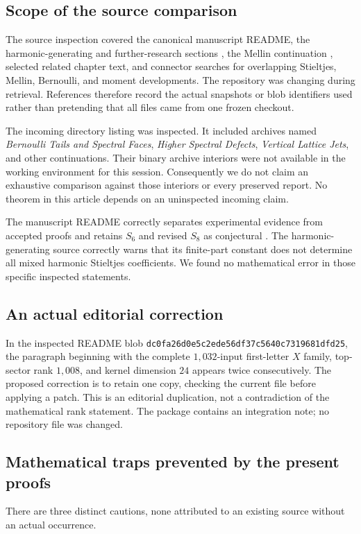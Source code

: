 \documentclass[11pt,letterpaper]{article}
\numberwithin{equation}{section}
\theoremstyle{definition}\newtheorem{definition}[theorem]{Definition}
\theoremstyle{remark}\newtheorem{remark}[theorem]{Remark}
\begin{document}
\subsection{Scope of the source comparison}
The source inspection covered the canonical manuscript README,
the harmonic-generating and further-research sections
\cite{RepoHarmonic,RepoQuestions}, the Mellin continuation
\cite{RepoMellin}, selected related chapter text, and connector searches
for overlapping Stieltjes, Mellin, Bernoulli, and moment developments.
The repository was changing during retrieval. References therefore
record the actual snapshots or blob identifiers used rather than
pretending that all files came from one frozen checkout.

The incoming directory listing was inspected. It included archives
named \emph{Bernoulli Tails and Spectral Faces}, \emph{Higher Spectral
Defects}, \emph{Vertical Lattice Jets}, and other continuations. Their
binary archive interiors were not available in the working environment
for this session. Consequently we do not claim an exhaustive comparison
against those interiors or every preserved report. No theorem in this
article depends on an uninspected incoming claim.

The manuscript README correctly separates experimental evidence from
accepted proofs and retains $S_6$ and revised $S_8$ as conjectural
\cite{RepoREADME}. The harmonic-generating source correctly warns that
its finite-part constant does not determine all mixed harmonic
Stieltjes coefficients. We found no mathematical error in those
specific inspected statements.

\subsection{An actual editorial correction}
In the inspected README blob
\texttt{dc0fa26d0e5c2ede56df37c5640c7319681dfd25}, the paragraph beginning
with the complete $1{,}032$-input first-letter $X$ family, top-sector
rank $1{,}008$, and kernel dimension $24$ appears twice consecutively.
The proposed correction is to retain one copy, checking the current
file before applying a patch. This is an editorial duplication, not a
contradiction of the mathematical rank statement. The package contains
an integration note; no repository file was changed.

\subsection{Mathematical traps prevented by the present proofs}
There are three distinct cautions, none attributed to an existing
source without an actual occurrence.
\end{document}
